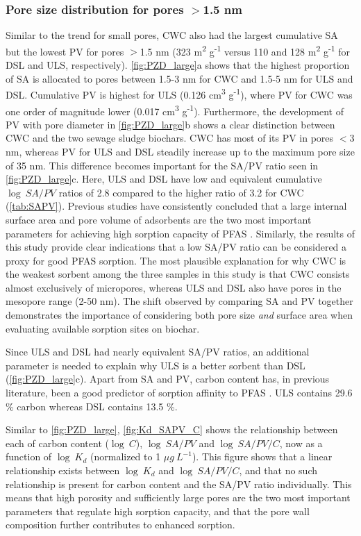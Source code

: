 \subsubsection{Pore size distribution for pores $>$1.5 nm}
Similar to the trend for small pores, CWC also had the largest cumulative SA but the lowest PV for pores $>$1.5 nm (323 m\textsuperscript{2} g\textsuperscript{-1} versus 110 and 128 m\textsuperscript{2} g\textsuperscript{-1} for DSL and ULS, respectively). \cref{fig:PZD_large}a shows that the highest proportion of SA is allocated to pores between 1.5-3 nm for CWC and 1.5-5 nm for ULS and DSL. Cumulative PV is highest for ULS (0.126 cm\textsuperscript{3} g\textsuperscript{-1}), where PV for CWC was one order of magnitude lower (0.017 cm\textsuperscript{3} g\textsuperscript{-1}). Furthermore, the development of PV with pore diameter in \cref{fig:PZD_large}b shows a clear distinction between CWC and the two sewage sludge biochars. CWC has most of its PV in pores $<$3 nm, whereas PV for ULS and DSL steadily increase up to the maximum pore size of 35 nm. This difference becomes important for the SA/PV ratio seen in \cref{fig:PZD_large}c. Here, ULS and DSL have low and equivalent cumulative $\log~SA/PV$ ratios of 2.8 compared to the higher ratio of 3.2 for CWC (\cref{tab:SAPV}). Previous studies have consistently concluded that a large internal surface area and pore volume of adsorbents are the two most important parameters for achieving high sorption capacity of PFAS \citep{du2014adsorption,Sormo2021,Hale2016,ahmed2020per}. Similarly, the results of this study provide clear indications that a low SA/PV ratio can be considered a proxy for good PFAS sorption. The most plausible explanation for why CWC is the weakest sorbent among the three samples in this study is that CWC consists almost exclusively of micropores, whereas ULS and DSL also have pores in the mesopore range (2-50 nm). The shift observed by comparing SA and PV together demonstrates the importance of considering both pore size \textit{and} surface area when evaluating available sorption sites on biochar.

Since ULS and DSL had nearly equivalent SA/PV ratios, an additional parameter is needed to explain why ULS is a better sorbent than DSL (\cref{fig:PZD_large}c). Apart from SA and PV, carbon content has, in previous literature, been a good predictor of sorption affinity to PFAS \citep{Hale2016,Cornelissen2005}. ULS contains 29.6 \% carbon whereas DSL contains 13.5 \%.  

Similar to \cref{fig:PZD_large}, \cref{fig:Kd_SAPV_C} shows the relationship between each of carbon content ($\log~C$), $\log~SA/PV$ and $\log~SA/PV/C$, now as a function of $\log~K_d$ (normalized to 1 $\mu g~L^{-1}$). This figure shows that a linear relationship exists between $\log~K_d$ and $\log~SA/PV/C$, and that no such relationship is present for carbon content and the SA/PV ratio individually. This means that high porosity and sufficiently large pores are the two most important parameters that regulate high sorption capacity, and that the pore wall composition further contributes to enhanced sorption. 

